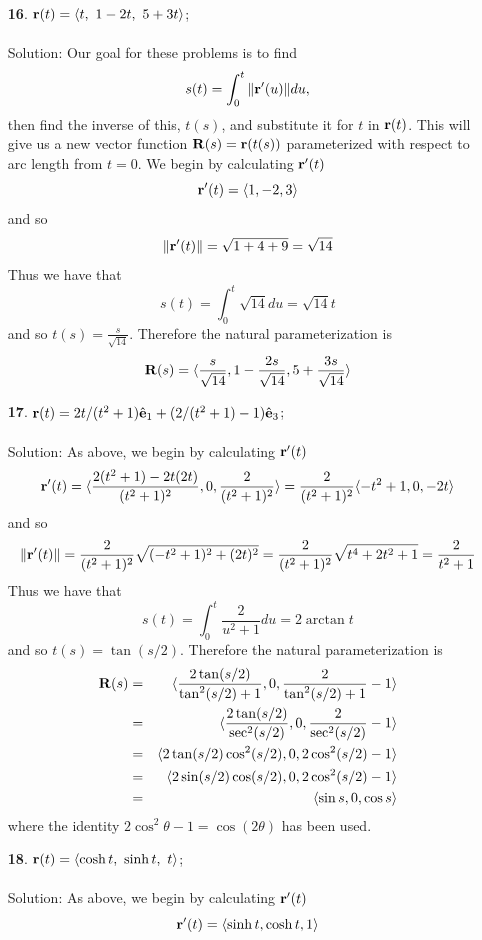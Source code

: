 \documentclass[12pt]{amsbook}
\newcommand{\la}{\langle}
\newcommand{\ra}{\rangle}
\begin{document}
\begin{enumerate}
  \item[{\small\bf 16}.] ${\bf r}(t)=\la t,\ 1-2t,\ 5+3t \ra$;
  \\
  \\
  {\sc Solution}: Our goal for these problems is to find 
  $$s(t)=\int_0^t \|{\bf r}'(u)\|du,$$
  then find the inverse of this, $t(s)$, and substitute it for $t$ in ${\bf r}(t)$. This will give us a new vector function ${\bf R}(s)={\bf r}(t(s))$ parameterized with respect to arc length from $t=0$. We begin by calculating ${\bf r}'(t)$
  $${\bf r}'(t)=\la 1,-2, 3 \ra$$
  and so 
  $$\|{\bf r}'(t)\|=\sqrt{1+4+9}=\sqrt{14}$$
  Thus we have that 
  $$s(t)=\int_0^t \sqrt{14} du =\sqrt{14}t$$
  and so $t(s)=\frac{s}{\sqrt{14}}$. Therefore the natural parameterization is
  $${\bf R}(s)=\la \frac{s}{\sqrt{14}}, 1-\frac{2s}{\sqrt{14}}, 5+\frac{3s}{\sqrt{14}} \ra$$
  \item[{\small\bf 17}.] ${\bf r}(t)=2t/(t^2+1)\hat{\bf e}_1+(2/(t^2+1)-1)\hat{\bf e}_3$;
  \\
  \\
  {\sc Solution}: As above, we begin by calculating ${\bf r}'(t)$
  $${\bf r}'(t)=\la \frac{2(t^2+1)-2t(2t)}{(t^2+1)^2},0,\frac{2}{(t^2+1)^2} \ra=\frac{2}{(t^2+1)^2}\la -t^2+1, 0 , -2t \ra$$
  and so 
  $$\|{\bf r}'(t)\|=\frac{2}{(t^2+1)^2}\sqrt{(-t^2+1)^2+(2t)^2}=\frac{2}{(t^2+1)^2}\sqrt{t^4+2t^2+1}=\frac{2}{t^2+1}$$
  Thus we have that 
  $$s(t)=\int_0^t \frac{2}{u^2+1} du =2\arctan t$$
  and so $t(s)=\tan (s/2)$. Therefore the natural parameterization is
\begin{eqnarray*}
{\bf R}(s)&=&\la \frac{2\tan(s/2)}{\tan^2(s/2)+1}, 0, \frac{2}{\tan^2(s/2)+1}-1 \ra \\
&=& \la \frac{2\tan (s/2)}{\sec^2(s/2)}, 0, \frac{2}{\sec^2(s/2)}-1 \ra\\
&=& \la 2\tan (s/2)\cos^2(s/2), 0, 2\cos^2(s/2)-1 \ra\\
&=& \la 2\sin(s/2)\cos(s/2), 0, 2\cos^2(s/2)-1 \ra\\
&=& \la \sin s, 0, \cos s \ra
\end{eqnarray*}  
  where the identity $2\cos^2 \theta -1 = \cos(2\theta)$ has been used.
  \\
  \item[{\small\bf 18}.] ${\bf r}(t)=\la \cosh t ,\ \sinh t,\ t \ra$;
  \\
  \\
  {\sc Solution}: As above, we begin by calculating ${\bf r}'(t)$
  $${\bf r}'(t)=\la \sinh t, \cosh t, 1 \ra$$

\end{enumerate}
\end{document}
